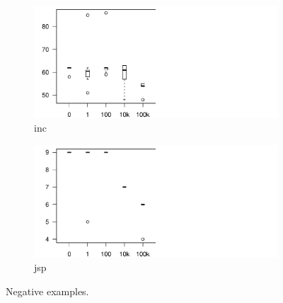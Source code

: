 \documentclass[conference]{IEEEtran}
\begin{document}
\begin{figure}  
  \vspace{-2.5ex}
  \centering
  \begin{subfigure}{.14\textwidth}
    \centering
    \includegraphics[scale=0.3,trim=15 0 130 0,clip]{R/inc/inc.pdf}
    \vspace{-3ex}    
    \caption{inc}    
  \end{subfigure}%
  \begin{subfigure}{.14\textwidth}
    \centering
    \includegraphics[scale=0.3,trim=15 0 130 0,clip]{R/jsp/jsp.pdf}
    \vspace{-3ex}    
    \caption{jsp}    
  \end{subfigure}%
  \vspace{-1ex}
  \caption{Negative examples.}
  \vspace{-2ex}
  \label{fig:impact-negative}
\end{figure}
\end{document}
